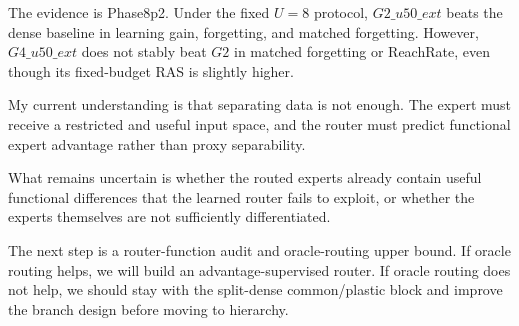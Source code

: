 \documentclass[11pt]{article}
\begin{document}
The evidence is Phase8p2. Under the fixed $U=8$ protocol, $G2\_u50\_ext$ beats the dense baseline in learning gain, forgetting, and matched forgetting. However, $G4\_u50\_ext$ does not stably beat $G2$ in matched forgetting or ReachRate, even though its fixed-budget RAS is slightly higher.

My current understanding is that separating data is not enough. The expert must receive a restricted and useful input space, and the router must predict functional expert advantage rather than proxy separability.

What remains uncertain is whether the routed experts already contain useful functional differences that the learned router fails to exploit, or whether the experts themselves are not sufficiently differentiated.

The next step is a router-function audit and oracle-routing upper bound. If oracle routing helps, we will build an advantage-supervised router. If oracle routing does not help, we should stay with the split-dense common/plastic block and improve the branch design before moving to hierarchy.
\end{document}
